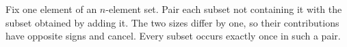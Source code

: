 Fix one element of an $n$-element set. Pair each subset not containing it with the subset obtained by adding it. The two sizes differ by one, so their contributions have opposite signs and cancel. Every subset occurs exactly once in such a pair.
